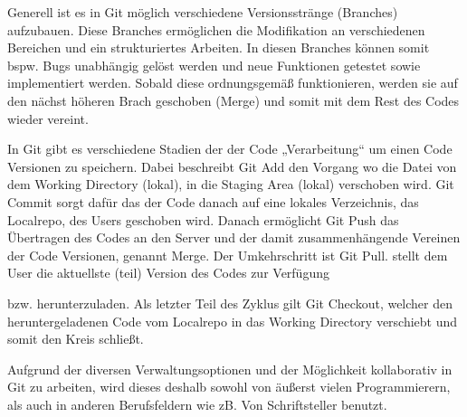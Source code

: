 \documentclass[]{dsadokumentation}
\begin{document}
Generell ist es in Git möglich verschiedene Versionsstränge (Branches) aufzubauen. Diese Branches ermöglichen die Modifikation an verschiedenen Bereichen und ein strukturiertes Arbeiten. In diesen Branches können somit bspw. Bugs unabhängig gelöst werden und neue Funktionen getestet sowie implementiert werden. Sobald diese ordnungsgemäß funktionieren, werden sie auf den nächst höheren Brach geschoben (Merge) und somit mit dem Rest des Codes wieder vereint.

In Git gibt es verschiedene Stadien der der Code „Verarbeitung“ um einen Code Versionen zu speichern. Dabei beschreibt Git Add den Vorgang wo die Datei von dem Working Directory (lokal), in die Staging Area (lokal) verschoben wird. Git Commit sorgt dafür das der Code danach auf eine lokales Verzeichnis, das Localrepo, des Users geschoben wird. Danach ermöglicht Git Push das Übertragen des Codes an den Server und der damit zusammenhängende Vereinen der Code Versionen, genannt Merge. Der Umkehrschritt ist Git Pull. stellt dem User die aktuellste (teil) Version des Codes zur Verfügung

bzw. herunterzuladen. Als letzter Teil des Zyklus gilt Git Checkout, welcher den heruntergeladenen Code vom Localrepo in das Working Directory verschiebt und somit den Kreis schließt.

Aufgrund der diversen Verwaltungsoptionen und der Möglichkeit kollaborativ in Git zu arbeiten, wird dieses deshalb sowohl von äußerst vielen Programmierern, als auch in anderen Berufsfeldern wie zB. Von Schriftsteller benutzt.

\printbibliography{}
\end{document}

